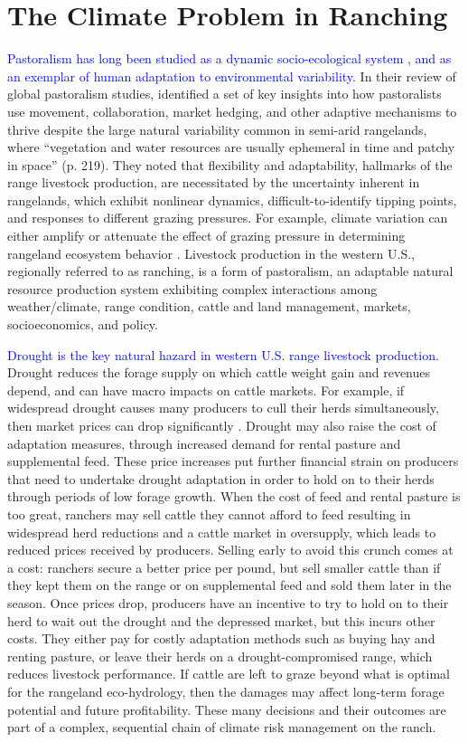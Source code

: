 \documentclass[11pt]{article}
\begin{document}
\section{The Climate Problem in Ranching}
\textcolor{blue}{Pastoralism has long been studied as a dynamic socio-ecological system \citep{Galaty1990}, and as an exemplar of human adaptation to environmental variability.} In their review of global pastoralism studies, \citet{Reid2014} identified a set of key insights into how pastoralists use movement, collaboration, market hedging, and other adaptive mechanisms to thrive despite the large natural variability common in semi-arid rangelands, where “vegetation and water resources are usually ephemeral in time and patchy in space” (p. 219). They noted that flexibility and adaptability, hallmarks of the range livestock production, are necessitated by the uncertainty inherent in rangelands, which exhibit nonlinear dynamics, difficult-to-identify tipping points, and responses to different grazing pressures. For example, climate variation can either amplify or attenuate the effect of grazing pressure in determining rangeland ecosystem behavior \citep{Briske2005, Ellis1988, Wehrden2012}. Livestock production in the western U.S., regionally referred to as ranching, is a form of pastoralism, an adaptable natural resource production system exhibiting complex interactions among weather/climate, range condition, cattle and land management, markets, socioeconomics, and policy. 

\textcolor{blue}{Drought is the key natural hazard in western U.S. range livestock production.} 
Drought reduces the forage supply on which cattle weight gain and revenues depend, and can have macro impacts on cattle markets. For example, if widespread drought causes many producers to cull their herds simultaneously, then market prices can drop significantly \citep{Scasta2016a}.  Drought may also raise the cost of adaptation measures, through increased demand for rental pasture and supplemental feed. These price increases put further financial strain on producers that need to undertake drought adaptation in order to hold on to their herds through periods of low forage growth. When the cost of feed and rental pasture is too great, ranchers may sell cattle they cannot afford to feed resulting in widespread herd reductions and a cattle market in oversupply, which leads to reduced prices received by producers. Selling early to avoid this crunch comes at a cost: ranchers secure a better price per pound, but sell smaller cattle than if they kept them on the range or on supplemental feed and sold them later in the season. Once prices drop, producers have an incentive to try to hold on to their herd to wait out the drought and the depressed market, but this incurs other costs. They either pay for costly adaptation methods such as buying hay and renting pasture, or leave their herds on a drought-compromised range, which reduces livestock performance. If cattle are left to graze beyond what is optimal for the rangeland eco-hydrology, then the damages may affect long-term forage potential and future profitability. These many decisions and their outcomes are part of a complex, sequential chain of climate risk management on the ranch.
\end{document}
